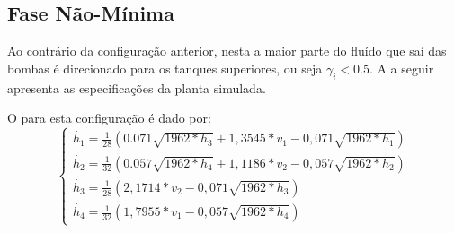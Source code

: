 \subsection{Fase Não-Mínima}
Ao contrário da configuração anterior, nesta a maior parte do fluído que saí das bombas é direcionado  para os tanques superiores, ou seja $\gamma_i < 0.5$. A  a seguir apresenta as especificações da planta simulada.

\begin{table}[!ht]
	\caption{Parâmetros da planta em fase não-mínima}
	\small
	\centering
	\label{tabFaseNaoMinima}
\end{table}

O  para esta configuração é dado por:
\begin{equation}
\begin{cases}
\dot{h_{1}} = \frac{1}{28}(0.071\sqrt{1962*h_{3}} + 1,3545*v_{1} - 0,071\sqrt{1962*h_{1}})\\

\dot{h_{2}} = \frac{1}{32}(0.057\sqrt{1962*h_{4}} + 1,1186*v_{2} - 0,057\sqrt{1962*h_{2}})\\

\dot{h_{3}} = \frac{1}{28}(2,1714*v_{2} - 0,071\sqrt{1962*h_{3}})\\

\dot{h_{4}} = \frac{1}{32}(1,7955*v_{1} - 0,057\sqrt{1962*h_{4}})
\end{cases}
\label{eqFNMNL}
\end{equation}

